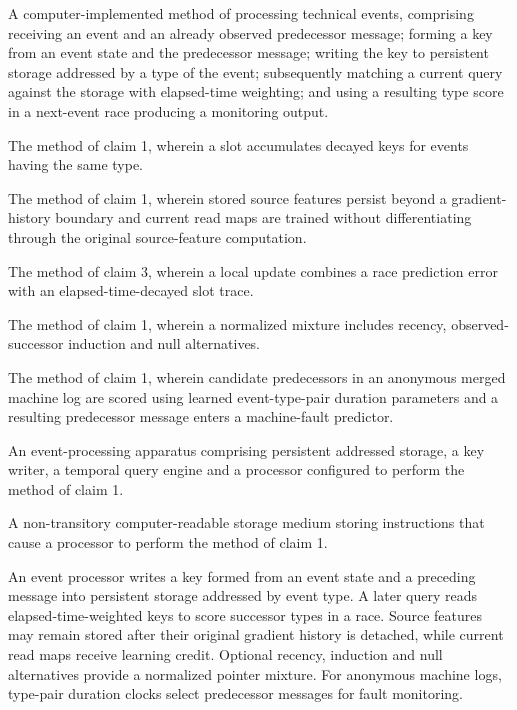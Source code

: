 \documentclass[pct]{sm-patent}
\begin{document}
\begin{patentclaims}

\item A computer-implemented method of processing technical events, comprising receiving an event and an already observed predecessor message; forming a key from an event state and the predecessor message; writing the key to persistent storage addressed by a type of the event; subsequently matching a current query against the storage with elapsed-time weighting; and using a resulting type score in a next-event race producing a monitoring output.

\item The method of claim 1, wherein a slot accumulates decayed keys for events having the same type.

\item The method of claim 1, wherein stored source features persist beyond a gradient-history boundary and current read maps are trained without differentiating through the original source-feature computation.

\item The method of claim 3, wherein a local update combines a race prediction error with an elapsed-time-decayed slot trace.

\item The method of claim 1, wherein a normalized mixture includes recency, observed-successor induction and null alternatives.

\item The method of claim 1, wherein candidate predecessors in an anonymous merged machine log are scored using learned event-type-pair duration parameters and a resulting predecessor message enters a machine-fault predictor.

\item An event-processing apparatus comprising persistent addressed storage, a key writer, a temporal query engine and a processor configured to perform the method of claim 1.

\item A non-transitory computer-readable storage medium storing instructions that cause a processor to perform the method of claim 1.

\end{patentclaims}

\abstractstart

An event processor writes a key formed from an event state and a preceding message into persistent storage addressed by event type. A later query reads elapsed-time-weighted keys to score successor types in a race. Source features may remain stored after their original gradient history is detached, while current read maps receive learning credit. Optional recency, induction and null alternatives provide a normalized pointer mixture. For anonymous machine logs, type-pair duration clocks select predecessor messages for fault monitoring.
\end{document}
